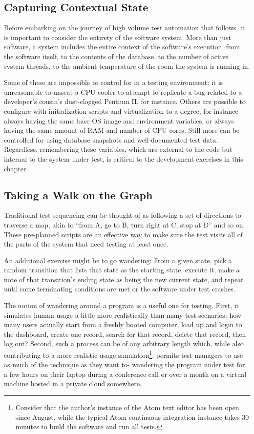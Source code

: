\subsection{Capturing Contextual State}
Before embarking on the journey of high volume test automation that follows, it is important to consider the entirety of the software system. More than just software, a system includes the entire context of the software's execution, from the software itself, to the contents of the database, to the number of active system threads, to the ambient temperature of the room the system is running in.

Some of these are impossible to control for in a testing environment: it is unreasonable to unseat a CPU cooler to attempt to replicate a bug related to a developer's cousin's dust-clogged Pentium II, for instance. Others are possible to configure with initialization scripts and virtualization to a degree, for instance always having the same base OS image and environment variables, or always having the same amount of RAM and number of CPU cores. Still more can be controlled for using database snapshots and well-documented test data. Regardless, remembering these variables, which are external to the code but internal to the system under test, is critical to the development exercises in this chapter. \citep{HoffmanTradeoffs}

\subsection{Taking a Walk on the Graph}
Traditional test sequencing can be thought of as following a set of directions to traverse a map, akin to ``from A, go to B, turn right at C, stop at D'' and so on. These pre-planned scripts are an effective way to make sure the test visits all of the parts of the system that need testing at least once.

An additional exercise might be to go wandering: From a given state, pick a random transition that lists that state as the starting state, execute it, make a note of that transition's ending state as being the new current state, and repeat until some terminating conditions are met or the software under test crashes.

The notion of wandering around a program is a useful one for testing. First, it simulates human usage a little more realistically than many test scenarios: how many users actually start from a freshly booted computer, load up and login to the dashboard, create one record, search for that record, delete that record, then log out? Second, such a process can be of any arbitrary length which, while also contributing to a more realistic usage simulation\footnote{Consider that the author's instance of the Atom text editor has been open since August, while the typical Atom continuous integration instance takes 30 minutes to build the software and run all tests.\citep{CircleCI}}, permits test managers to use as much of the technique as they want to- wandering the program under test for a few hours on their laptop during a conference call or over a month on a virtual machine hosted in a private cloud somewhere.

